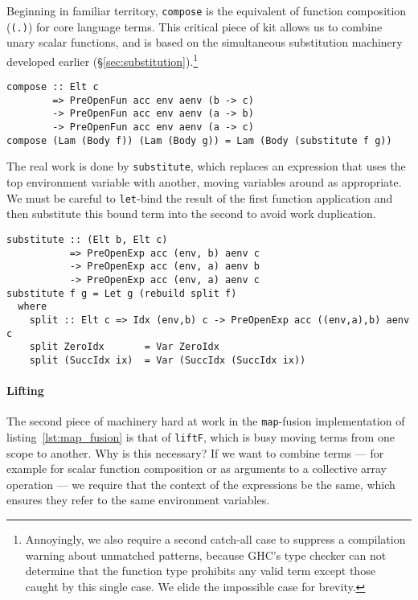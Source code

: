 Beginning in familiar territory, \texttt{compose} is the equivalent of function
composition (\texttt{(.)}) for core language terms. This critical piece of kit
allows us to combine unary scalar functions, and is based on the simultaneous
substitution machinery developed earlier
(\S\ref{sec:substitution}).\footnote{Annoyingly, we also require a second
catch-all case to suppress a compilation warning about unmatched patterns,
because GHC's type checker can not determine that the function type prohibits
any valid term except those caught by this single case. We elide the impossible
case for brevity.}
%
\begin{lstlisting}[style=haskell]
compose :: Elt c
        => PreOpenFun acc env aenv (b -> c)
        -> PreOpenFun acc env aenv (a -> b)
        -> PreOpenFun acc env aenv (a -> c)
compose (Lam (Body f)) (Lam (Body g)) = Lam (Body (substitute f g))
\end{lstlisting}
%
The real work is done by \texttt{substitute}, which replaces an expression that
uses the top environment variable with another, moving variables around as
appropriate. We must be careful to \texttt{let}-bind the result of the first
function application and then substitute this bound term into the second to
avoid work duplication.
%
\begin{lstlisting}[style=haskell]
substitute :: (Elt b, Elt c)
           => PreOpenExp acc (env, b) aenv c
           -> PreOpenExp acc (env, a) aenv b
           -> PreOpenExp acc (env, a) aenv c
substitute f g = Let g (rebuild split f)
  where
    split :: Elt c => Idx (env,b) c -> PreOpenExp acc ((env,a),b) aenv c
    split ZeroIdx       = Var ZeroIdx
    split (SuccIdx ix)  = Var (SuccIdx (SuccIdx ix))
\end{lstlisting}


\paragraph{Lifting}

The second piece of machinery hard at work in the \texttt{map}-fusion
implementation of listing~\ref{lst:map_fusion} is that of \texttt{liftF}, which
is busy moving terms from one scope to another. Why is this necessary? If we
want to combine terms --- for example for scalar function composition or as
arguments to a collective array operation --- we require that the context of the
expressions be the same, which ensures they refer to the same environment
variables.

